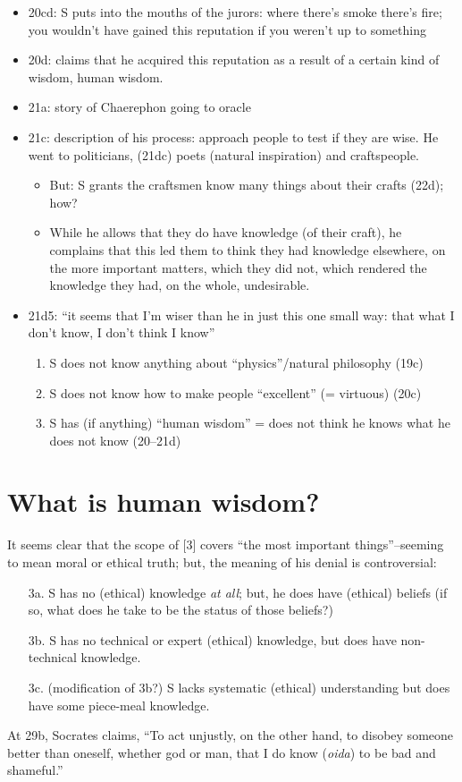 \documentclass[10 pt]{article}
\begin{document}
\begin{itemize}
\item 20cd: S puts into the mouths of the jurors: where there’s smoke there’s fire; you wouldn’t have gained this reputation if you weren’t up to something
\item 20d: claims that he acquired this reputation as a result of a certain kind of wisdom, human wisdom.
\item	21a: story of Chaerephon going to oracle
\item	21c: description of his process: approach people to test if they are wise. He went to politicians, (21dc) poets (natural inspiration) and craftspeople.
\begin{itemize} \item  But: S grants the craftsmen know many things about their crafts (22d); how? 
\item While he allows that they do have knowledge (of their craft), he complains that this led them to think they had knowledge elsewhere, on the more important matters, which they did not, which rendered the knowledge they had, on the whole, undesirable.
\end{itemize}

\item  21d5: ``it seems that I’m wiser than he in just this one small way: that what I don’t know, I don’t think I know''
\begin{enumerate}
\item S does not know anything about ``physics''/natural philosophy (19c)
\item S does not know how to make people ``excellent'' (= virtuous) (20c)
\item S has (if anything) ``human wisdom'' = does not think he knows what he does not know (20--21d)


\end{enumerate}
\end{itemize}
\section*{What is human wisdom?}

It seems clear that the scope of [3] covers ``the most important things''--seeming to mean moral or ethical truth; but, the meaning of his denial is controversial:

\begin{enumerate}\item[3a.] S has no (ethical) knowledge \emph{at all}; but, he does have (ethical) beliefs (if so, what does he take to be the status of those beliefs?)

\item[3b.] S has no technical or expert (ethical) knowledge, but does have non-technical knowledge.
\item[3c.] (modification of 3b?) S lacks systematic (ethical) understanding but does have some piece-meal knowledge.
\end{enumerate}
\noindent At 29b, Socrates claims, ``To act unjustly, on the other hand, to disobey someone better than oneself, whether god or man, that I do know (\emph{oida}) to be bad and shameful.''
\end{document}
